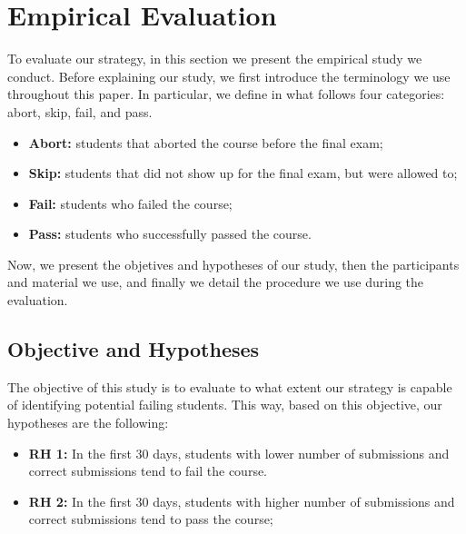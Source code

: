 \section{Empirical Evaluation}

\label{sec:evaluation}

To evaluate our strategy, in this section we present the empirical study we conduct. Before explaining our study, we first introduce the terminology we use throughout this paper. In particular, we define in what follows four categories: abort, skip, fail, and pass.

\begin{itemize}

	\item \textbf{Abort:} students that aborted the course before the final exam;
	\item \textbf{Skip:} students that did not show up for the final exam, but were allowed to;
	\item \textbf{Fail:} students who failed the course;
	\item \textbf{Pass:} students who successfully passed the course.


\end{itemize}

Now, we present the objetives and hypotheses of our study, then the participants and material we use, and finally we detail the procedure we use during the evaluation.

\subsection{Objective and Hypotheses}

The objective of this study is to evaluate to what extent our strategy is capable of identifying potential failing students. This way, based on this objective, our hypotheses are the following:

\begin{itemize}

	\item \textbf{RH 1:} In the first 30 days, students with lower number of submissions and correct submissions tend to fail the course.

	\item \textbf{RH 2:} In the first 30 days, students with higher number of submissions and correct submissions tend to pass the course;

\end{itemize}

